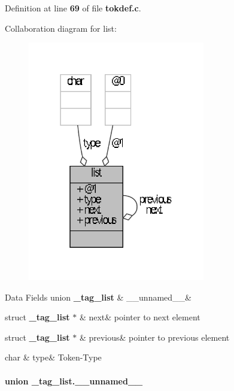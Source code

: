 \-Definition at line {\bf 69} of file {\bf tokdef.\-c}.



\-Collaboration diagram for list\-:\nopagebreak
\begin{figure}[H]
\begin{center}
\leavevmode
\includegraphics[width=219pt]{struct__tag__list__coll__graph}
\end{center}
\end{figure}
\begin{DoxyFields}{\-Data Fields}
union {\bf \-\_\-tag\-\_\-list}\label{tokdef_8c_af223457b2a0eb1c2fdaa6b7e3ca7a600}
&
\-\_\-\-\_\-unnamed\-\_\-\-\_\-&
\\
\hline

struct {\bf \-\_\-tag\-\_\-list} $\ast$\label{tokdef_8c_a3778a8980f4cc9236d8288e5e364b9d3}
&
next&
pointer to next element \\
\hline

struct {\bf \-\_\-tag\-\_\-list} $\ast$\label{tokdef_8c_aff2d3980f345bfd4ed08d44550f481bf}
&
previous&
pointer to previous element \\
\hline

char\label{tokdef_8c_a1b949e00a2c76f6830b80942c1d65341}
&
type&
\-Token-\/\-Type \\
\hline

\end{DoxyFields}
\label{union__tag__list_8____unnamed____}
\paragraph{union \-\_\-tag\-\_\-list.\-\_\-\-\_\-unnamed\-\_\-\-\_\-}


